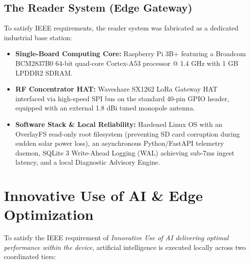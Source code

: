 \documentclass[10pt,conference,letterpaper]{IEEEtran}
\begin{document}
\subsection{The Reader System (Edge Gateway)}
To satisfy IEEE requirements, the reader system was fabricated as a dedicated industrial base station:
\begin{itemize}
    \item \textbf{Single-Board Computing Core:} Raspberry Pi 3B+ featuring a Broadcom BCM2837B0 64-bit quad-core Cortex-A53 processor @ 1.4 GHz with 1 GB LPDDR2 SDRAM.
    \item \textbf{RF Concentrator HAT:} Waveshare SX1262 LoRa Gateway HAT interfaced via high-speed SPI bus on the standard 40-pin GPIO header, equipped with an external 1.8 dBi tuned monopole antenna.
    \item \textbf{Software Stack \& Local Reliability:} Hardened Linux OS with an OverlayFS read-only root filesystem (preventing SD card corruption during sudden solar power loss), an asynchronous Python/FastAPI telemetry daemon, SQLite 3 Write-Ahead Logging (WAL) achieving sub-7ms ingest latency, and a local Diagnostic Advisory Engine.
\end{itemize}

\section{Innovative Use of AI \& Edge Optimization}
To satisfy the IEEE requirement of \textit{Innovative Use of AI delivering optimal performance within the device}, artificial intelligence is executed locally across two coordinated tiers:
\end{document}
